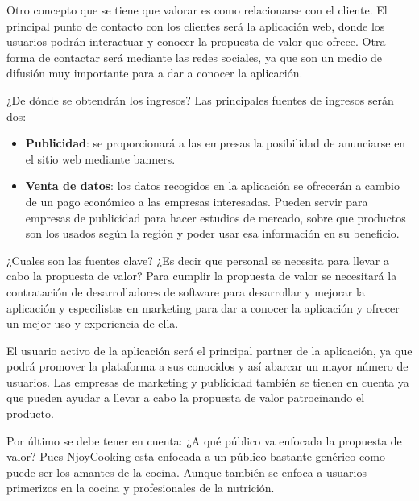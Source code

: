 \vspace{5 mm}

Otro concepto que se tiene que valorar es como relacionarse con el cliente. El principal punto de contacto con los clientes será la aplicación web, donde los usuarios podrán interactuar y conocer la propuesta de valor que ofrece. Otra forma de contactar será mediante las redes sociales, ya que son un medio de difusión muy importante para a dar a conocer la aplicación.

\vspace{5 mm}

¿De dónde se obtendrán los ingresos? Las principales fuentes de ingresos serán dos:

\begin{itemize}

\item \textbf{Publicidad}: se proporcionará a las empresas la posibilidad de anunciarse en el sitio web mediante banners.

\item \textbf{Venta de datos}: los datos recogidos en la aplicación se ofrecerán a cambio de un pago económico a las empresas interesadas. Pueden servir para empresas de publicidad para hacer estudios de mercado, sobre que productos son los usados según la región y poder usar esa información en su beneficio.

\end{itemize} 

\vspace{5 mm}

¿Cuales son las fuentes clave? ¿Es decir que personal se necesita para llevar a cabo la propuesta de valor? Para cumplir la propuesta de valor se necesitará la contratación de desarrolladores de software para desarrollar y mejorar la aplicación y especilistas en marketing para dar a conocer la aplicación y ofrecer un mejor uso y experiencia de ella.

\vspace{5 mm}

El usuario activo de la aplicación será el principal partner de la aplicación, ya que podrá promover la plataforma a sus conocidos y así abarcar un mayor número de usuarios. Las empresas de marketing y publicidad también se tienen en cuenta ya que pueden ayudar a llevar a cabo la propuesta de valor patrocinando el producto.


\vspace{5 mm}

Por último se debe tener en cuenta: ¿A qué público va enfocada la propuesta de valor? Pues NjoyCooking esta enfocada a un público bastante genérico como puede ser los amantes de la cocina. Aunque también se enfoca a usuarios primerizos en la cocina y profesionales de la nutrición.


